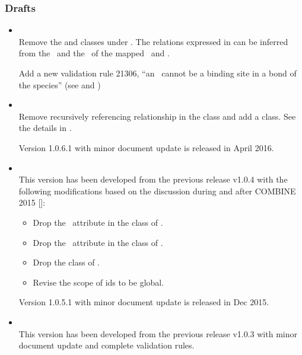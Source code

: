 \subsubsection{Drafts}

\begin{itemize}
 \item {} \\
 \label{def:v1_0_7}
 Remove the  and  classes under \SpeciesTypeComponentMapInProduct. The relations expressed in  can be inferred from the \speciesTypeComponentMapInProduct\ and the \species\ of the mapped \reactant\ and \product.
 
 Add a new validation rule 21306, ``an \outwardBindingSite\ cannot be a binding site in a bond of the species'' (see  and )

 \item {} \\
 \label{def:v1_0_6}
 Remove recursively referencing relationship in the \ListOfSpeciesFeatures class and add a \SubListOfSpeciesFeatures class. See the details in \ExSpecies.
 
 Version 1.0.6.1 with minor document update is released in April 2016.

 \item {} \\
 \label{def:v1_0_5}
 This version has been developed from the previous release v1.0.4 with the following modifications based on the discussion during and after COMBINE 2015 [\cite{ref:combine2015}]: 
 \begin{itemize}
  \item Drop the \occurAtt\ attribute in the class of \SpeciesTypeInstance.
  \item Drop the \occurAtt\ attribute in the class of \SpeciesTypeComponentIndex.
  \item Drop the class of .
  \item Revise the scope of \PossibleSpeciesFeatureValue ids to be global.
 \end{itemize}

Version 1.0.5.1 with minor document update is released in Dec 2015.

 \item {} \\
 \label{def:v1_0_4}
 This version has been developed from the previous release v1.0.3 with minor document update and complete validation rules.


\end{itemize}
